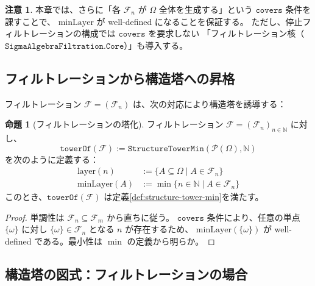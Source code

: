 \documentclass[11pt,a4paper,ja=standard]{ltjsarticle}
\theoremstyle{definition}
\newtheorem{proposition}[definition]{命題}
\newtheorem{remark}[definition]{注意}
\newcommand{\N}{\mathbb{N}}
\newcommand{\F}{\mathcal{F}}
\newcommand{\minLayer}{\mathrm{minLayer}}
\newcommand{\layer}{\mathrm{layer}}
\begin{document}
\begin{remark}
本章では、さらに「各 $\F_n$ が $\Omega$ 全体を生成する」という $\mathtt{covers}$ 条件を課すことで、
$\minLayer$ が well-defined になることを保証する。
ただし、停止フィルトレーションの構成では $\mathtt{covers}$ を要求しない
「フィルトレーション核（$\mathtt{SigmaAlgebraFiltration.Core}$）」も導入する。
\end{remark}

\subsection{フィルトレーションから構造塔への昇格}

フィルトレーション $\F = (\F_n)$ は、次の対応により構造塔を誘導する：

\begin{proposition}[フィルトレーションの塔化]\label{prop:filtration-to-tower}
フィルトレーション $\F = (\F_n)_{n \in \N}$ に対し、
\[
\mathtt{towerOf}(\F) := \mathtt{StructureTowerMin}(\mathcal{P}(\Omega), \N)
\]
を次のように定義する：
\begin{align*}
\layer(n) &:= \{ A \subseteq \Omega \mid A \in \F_n \} \\
\minLayer(A) &:= \min \{ n \in \N \mid A \in \F_n \}
\end{align*}
このとき、$\mathtt{towerOf}(\F)$ は定義\ref{def:structure-tower-min}を満たす。
\end{proposition}

\begin{proof}
単調性は $\F_n \subseteq \F_m$ から直ちに従う。
$\mathtt{covers}$ 条件により、任意の単点 $\{\omega\}$ に対し $\{\omega\} \in \F_n$ となる $n$ が存在するため、
$\minLayer(\{\omega\})$ が well-defined である。最小性は $\min$ の定義から明らか。
\end{proof}

\subsection{構造塔の図式：フィルトレーションの場合}

\begin{center}
\end{center}
\end{document}
